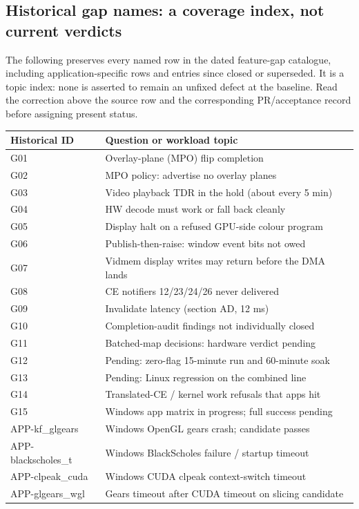 \subsection{Historical gap names: a coverage index, not current verdicts}
The following preserves every named row in the dated feature-gap catalogue, including
application-specific rows and entries since closed or superseded. It is a topic index:
none is asserted to remain an unfixed defect at the baseline. Read the correction above
the source row and the corresponding PR/acceptance record before assigning present status.

{\small
\begin{longtable}{@{}p{38mm}p{117mm}@{}}
\toprule Historical ID & Question or workload topic \\
\midrule\endhead
G01 & Overlay-plane (MPO) flip completion \\
G02 & MPO policy: advertise no overlay planes \\
G03 & Video playback TDR in the hold (about every 5 min) \\
G04 & HW decode must work or fall back cleanly \\
G05 & Display halt on a refused GPU-side colour program \\
G06 & Publish-then-raise: window event bits not owed \\
G07 & Vidmem display writes may return before the DMA lands \\
G08 & CE notifiers 12/23/24/26 never delivered \\
G09 & Invalidate latency (section AD, 12 ms) \\
G10 & Completion-audit findings not individually closed \\
G11 & Batched-map decisions: hardware verdict pending \\
G12 & Pending: zero-flag 15-minute run and 60-minute soak \\
G13 & Pending: Linux regression on the combined line \\
G14 & Translated-CE / kernel work refusals that apps hit \\
G15 & Windows app matrix in progress; full success pending \\
APP-kf\_glgears & Windows OpenGL gears crash; candidate passes \\
APP-blackscholes\_t & Windows BlackScholes failure / startup timeout \\
APP-clpeak\_cuda & Windows CUDA clpeak context-switch timeout \\
APP-glgears\_wgl & Gears timeout after CUDA timeout on slicing candidate \\

\end{longtable}}

